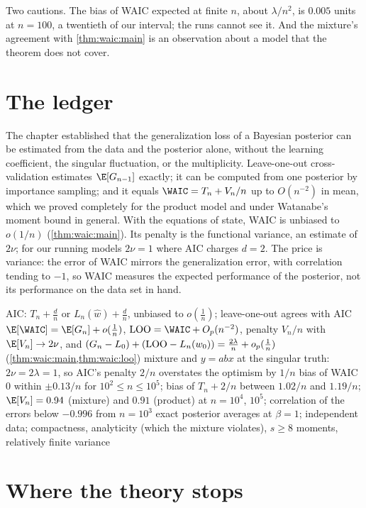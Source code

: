 \begin{refsection}
Two cautions. The bias of WAIC expected at finite $n$, about $\lambda/n^2$, is $0.005$ units at $n=100$, a twentieth of our interval; the runs cannot see it. And the mixture's agreement with \cref{thm:waic:main} is an observation about a model that the theorem does not cover.

\section{The ledger}\label{sec:waic:ledger}

The chapter established that the generalization loss of a Bayesian posterior can be estimated from the data and the posterior alone, without the learning coefficient, the singular fluctuation, or the multiplicity. Leave-one-out cross-validation estimates $\E[G_{n-1}]$ exactly; it can be computed from one posterior by importance sampling; and it equals $\WAIC=T_n+V_n/n$ up to $O(n^{-2})$ in mean, which we proved completely for the product model and under Watanabe's moment bound in general. With the equations of state, WAIC is unbiased to $o(1/n)$ (\cref{thm:waic:main}). Its penalty is the functional variance, an estimate of $2\nu$; for our running models $2\nu=1$ where AIC charges $d=2$. The price is variance: the error of WAIC mirrors the generalization error, with correlation tending to $-1$, so WAIC measures the expected performance of the posterior, not its performance on the data set in hand.

{AIC: $T_n+\tfrac dn$ or $L_n(\hat w)+\tfrac dn$, unbiased to $o(\tfrac1n)$; leave-one-out agrees with AIC}
{$\E[\WAIC]=\E[G_n]+o(\tfrac1n)$, $\waicLOO=\WAIC+O_p(n^{-2})$, penalty $V_n/n$ with $\E[V_n]\to2\nu$, and $(G_n-L_0)+(\mathrm{LOO}-L_n(w_0))=\tfrac{2\lambda}n+o_p(\tfrac1n)$ (\cref{thm:waic:main,thm:waic:loo})}
{mixture and $y=abx$ at the singular truth: $2\nu=2\lambda=1$, so AIC's penalty $2/n$ overstates the optimism by $1/n$}
{bias of WAIC $0$ within $\pm0.13/n$ for $10^2\le n\le10^5$; bias of $T_n+2/n$ between $1.02/n$ and $1.19/n$; $\E[V_n]=0.94$ (mixture) and $0.91$ (product) at $n=10^4$, $10^5$; correlation of the errors below $-0.996$ from $n=10^3$}
{exact posterior averages at $\beta=1$; independent data; compactness, analyticity (which the mixture violates), $s\ge8$ moments, relatively finite variance}

\section{Where the theory stops}\label{sec:waic:stops}


\end{refsection}
